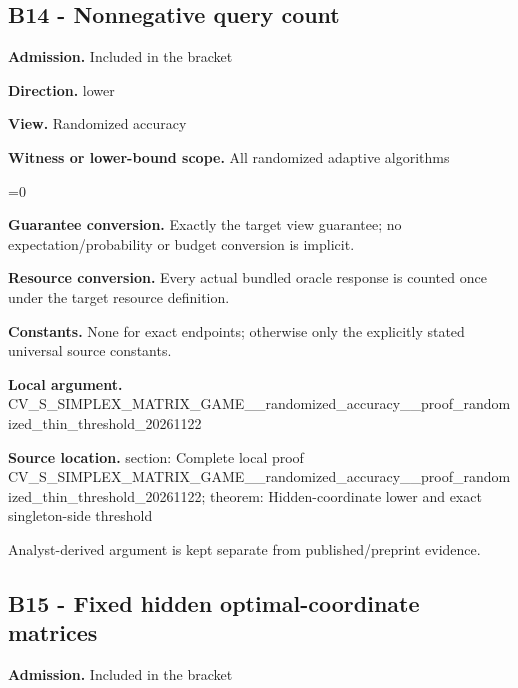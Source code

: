 \documentclass[10pt,a4paper]{article}
\newcommand{\AtlasMath}[1]{\par\begingroup\centering\setbox0=\hbox{$\displaystyle #1$}\ifdim\wd0>1.4\linewidth\typeout{ATLAS WIDE FORMULA: \the\wd0}\fi\ifdim\wd0>\linewidth\resizebox{\linewidth}{!}{\box0}\else\box0\fi\par\endgroup}
\begin{document}
\subsection{B14 - Nonnegative query count}


\textbf{Admission.} Included in the bracket



\textbf{Direction.} lower



\textbf{View.} Randomized accuracy



\textbf{Witness or lower-bound scope.} All randomized adaptive algorithms



\AtlasMath{0}


\textbf{Guarantee conversion.} Exactly the target view guarantee; no expectation/probability or budget conversion is implicit.



\textbf{Resource conversion.} Every actual bundled oracle response is counted once under the target resource definition.



\textbf{Constants.} None for exact endpoints; otherwise only the explicitly stated universal source constants.



\textbf{Local argument.} CV\_S\_SIMPLEX\_MATRIX\_GAME\allowbreak{}\_\_randomized\_accuracy\_\_p\allowbreak{}roof\_randomized\_thin\_thr\allowbreak{}eshold\_20261122



\textbf{Source location.}  section: Complete local proof CV\_S\_SIMPLEX\_MATRIX\_GAME\allowbreak{}\_\_randomized\_accuracy\_\_p\allowbreak{}roof\_randomized\_thin\_thr\allowbreak{}eshold\_20261122; theorem: Hidden-coordinate lower and exact singleton-side threshold



Analyst-derived argument is kept separate from published/preprint evidence.



\subsection{B15 - Fixed hidden optimal-coordinate matrices}


\textbf{Admission.} Included in the bracket
\end{document}
